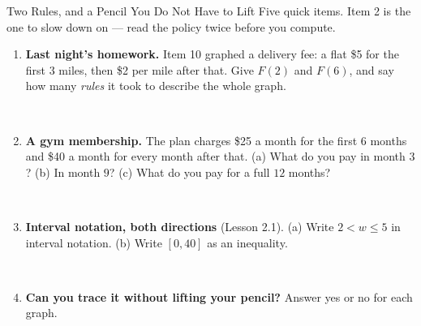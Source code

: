 \documentclass[10pt]{article}
\begin{document}

\vspace{0.15in}

\begin{notesbox}{Two Rules, and a Pencil You Do Not Have to Lift}
\small
Five quick items. Item 2 is the one to slow down on --- read the policy twice before you compute.

\begin{enumerate}[leftmargin=1.6em, itemsep=4pt, topsep=4pt]

\item \textbf{Last night's homework.} Item 10 graphed a delivery fee: a flat \$5 for the first $3$
miles, then \$2 per mile after that. Give $F(2)$ and $F(6)$, and say how many \emph{rules} it took to
describe the whole graph.

\\

\item \textbf{A gym membership.} The plan charges \$25 a month for the first $6$ months and \$40 a
month for every month after that. \quad (a) What do you pay in month $3$? \quad (b) In month $9$?
\quad (c) What do you pay for a full $12$ months?

\\

\item \textbf{Interval notation, both directions} (Lesson 2.1). \quad (a) Write $2 < w \le 5$ in
interval notation. \quad (b) Write $[0,40]$ as an inequality.

\ansline{(a) $(2,5]$ --- parenthesis excludes $2$, bracket includes $5$. \quad (b) $0 \le h \le 40$.}\\

\item \textbf{Can you trace it without lifting your pencil?} Answer yes or no for each graph.
\smallskip


\end{enumerate}
\end{notesbox}
\end{document}
